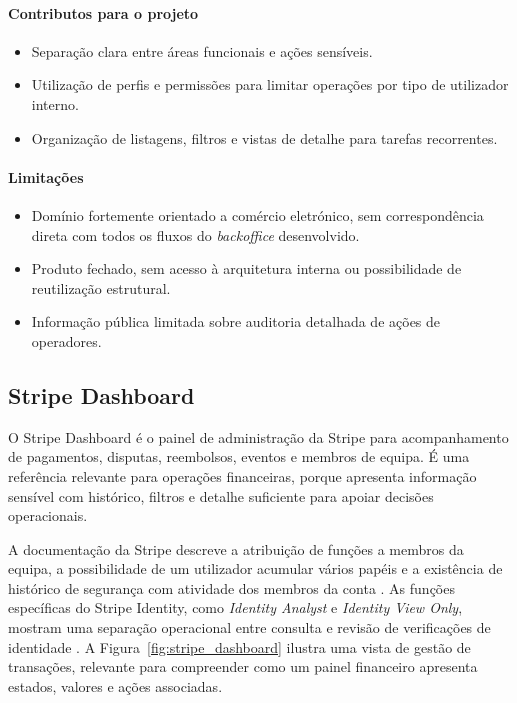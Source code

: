 \paragraph{Contributos para o projeto}
\begin{itemize}
  \item Separação clara entre áreas funcionais e ações sensíveis.
  \item Utilização de perfis e permissões para limitar operações por tipo de utilizador interno.
  \item Organização de listagens, filtros e vistas de detalhe para tarefas recorrentes.
\end{itemize}

\paragraph{Limitações}
\begin{itemize}
  \item Domínio fortemente orientado a comércio eletrónico, sem correspondência direta com todos os fluxos do \textit{backoffice} desenvolvido.
  \item Produto fechado, sem acesso à arquitetura interna ou possibilidade de reutilização estrutural.
  \item Informação pública limitada sobre auditoria detalhada de ações de operadores.
\end{itemize}

\subsection{Stripe Dashboard}
\label{subsec:stripe_dashboard}

O Stripe Dashboard é o painel de administração da Stripe para acompanhamento de pagamentos, disputas, reembolsos, eventos e membros de equipa. É uma referência relevante para operações financeiras, porque apresenta informação sensível com histórico, filtros e detalhe suficiente para apoiar decisões operacionais.

A documentação da Stripe descreve a atribuição de funções a membros da equipa, a possibilidade de um utilizador acumular vários papéis e a existência de histórico de segurança com atividade dos membros da conta \cite{StripeTeams}. As funções específicas do Stripe Identity, como \textit{Identity Analyst} e \textit{Identity View Only}, mostram uma separação operacional entre consulta e revisão de verificações de identidade \cite{StripeUserRoles}. A Figura~\ref{fig:stripe_dashboard} ilustra uma vista de gestão de transações, relevante para compreender como um painel financeiro apresenta estados, valores e ações associadas.

